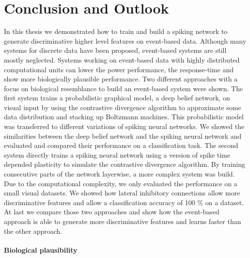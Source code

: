 \chapter{Conclusion and Outlook}

In this thesis we demonstrated how to train and build a spiking network to generate discriminative higher level features on event-based data.
Although many systems for discrete data have been proposed, event-based systems are still mostly neglected.
Systems working on event-based data with highly distributed computational units can lower the power performance, the response-time and show more biologically plausible performance.  
Two different approaches with a focus on biological resemblance to build an event-based system were shown.
The first system trains a probabilistic graphical model, a deep belief network, on visual input by using the contrastive divergence algorithm to approximate some data distribution and stacking up Boltzmann machines.
This probabilistic model was transferred to different variations of spiking neural networks.
We showed the similarities between the deep belief network and the spiking neural network and evaluated and compared their performance on a classification task.   
The second system directly trains a spiking neural network using a version of spike time depended plasticity to simulate the contrastive divergence algorithm. By training consecutive parts of the network layerwise, a more complex system was build. Due to the computational complexity, we only evaluated the performance on a small visual datasets. We showed how lateral inhibitory connections allow more discriminative features and allow a classification accuracy of 100 $\%$ on a dataset.
At last we compare those two approaches and show how the event-based approach is able to generate more discriminative features and learns faster than the other approach.  

\subsubsection{Biological plausibility}

